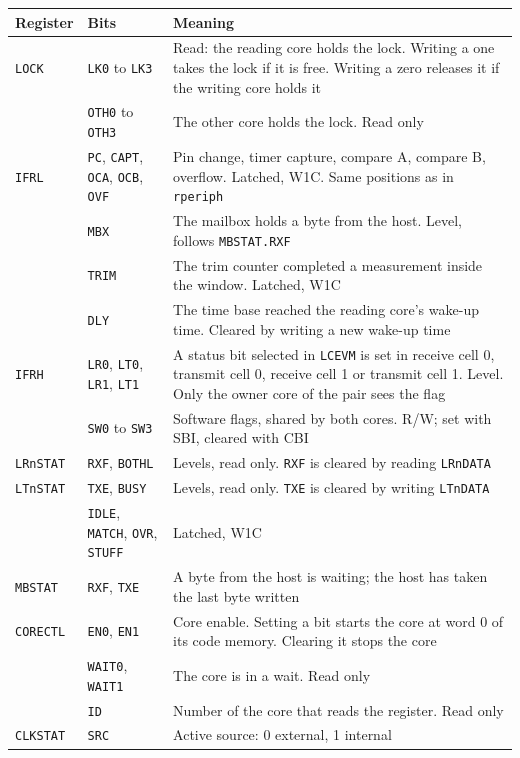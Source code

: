\documentclass[10pt,a4paper]{article}
\newcommand{\reg}[1]{\texttt{#1}}
\begin{document}
\begin{table}[H]
\centering\small
\begin{tabularx}{\linewidth}{@{}llL@{}}
\toprule
Register & Bits & Meaning \\
\midrule
\reg{LOCK} & \reg{LK0} to \reg{LK3} & Read: the reading core holds the lock. Writing a one takes the lock if it is free. Writing a zero releases it if the writing core holds it \\
 & \reg{OTH0} to \reg{OTH3} & The other core holds the lock. Read only \\
\reg{IFRL} & \reg{PC}, \reg{CAPT}, \reg{OCA}, \reg{OCB}, \reg{OVF} & Pin change, timer capture, compare A, compare B, overflow. Latched, W1C. Same positions as in \texttt{rperiph} \\
 & \reg{MBX} & The mailbox holds a byte from the host. Level, follows \reg{MBSTAT.RXF} \\
 & \reg{TRIM} & The trim counter completed a measurement inside the window. Latched, W1C \\
 & \reg{DLY} & The time base reached the reading core's wake-up time. Cleared by writing a new wake-up time \\
\reg{IFRH} & \reg{LR0}, \reg{LT0}, \reg{LR1}, \reg{LT1} & A status bit selected in \reg{LCEVM} is set in receive cell 0, transmit cell 0, receive cell 1 or transmit cell 1. Level. Only the owner core of the pair sees the flag \\
 & \reg{SW0} to \reg{SW3} & Software flags, shared by both cores. R/W; set with SBI, cleared with CBI \\
\reg{LRnSTAT} & \reg{RXF}, \reg{BOTHL} & Levels, read only. \reg{RXF} is cleared by reading \reg{LRnDATA} \\
\reg{LTnSTAT} & \reg{TXE}, \reg{BUSY} & Levels, read only. \reg{TXE} is cleared by writing \reg{LTnDATA} \\
 & \reg{IDLE}, \reg{MATCH}, \reg{OVR}, \reg{STUFF} & Latched, W1C \\
\reg{MBSTAT} & \reg{RXF}, \reg{TXE} & A byte from the host is waiting; the host has taken the last byte written \\
\reg{CORECTL} & \reg{EN0}, \reg{EN1} & Core enable. Setting a bit starts the core at word 0 of its code memory. Clearing it stops the core \\
 & \reg{WAIT0}, \reg{WAIT1} & The core is in a wait. Read only \\
 & \reg{ID} & Number of the core that reads the register. Read only \\
\reg{CLKSTAT} & \reg{SRC} & Active source: 0 external, 1 internal \\

\end{tabularx}
\end{table}
\end{document}
